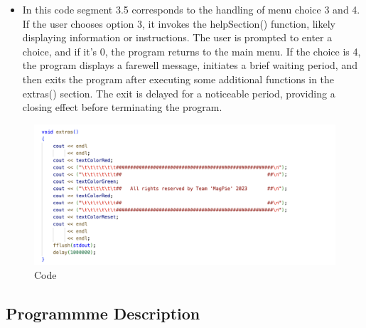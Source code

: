 \begin{itemize}
        \item In this code segment 3.5 corresponds to the handling of menu choice 3 and 4. If the user chooses option 3, it invokes the helpSection() function, likely displaying information or instructions. The user is prompted to enter a choice, and if it's 0, the program returns to the main menu. If the choice is 4, the program displays a farewell message, initiates a brief waiting period, and then exits the program after executing some additional functions in the extras() section. The exit is delayed for a noticeable period, providing a closing effect before terminating the program.
\end{itemize}
\newpage
\begin{figure}[h]
     \includegraphics[scale=0.25]{CodeScreenShot/Extra-FooterSection.png}
    \caption{Code}
    \label{fig:code-screenshots}
\end{figure}

\subsection{Programmme Description}

